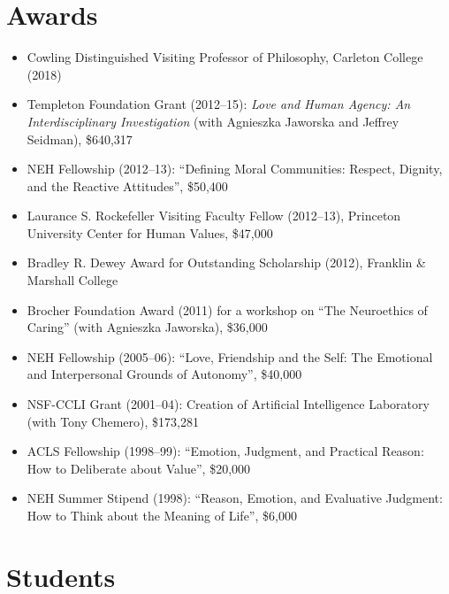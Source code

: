 \documentclass[%
  11pt,%
]{article}
\begin{document}
\section{Awards}

\begin{itemize}

  \item Cowling Distinguished Visiting Professor of Philosophy, Carleton College (2018)
  \item Templeton Foundation Grant (2012--15): \emph{Love and Human Agency: An Interdisciplinary Investigation} (with Agnieszka Jaworska and Jeffrey Seidman), \$640,317
  \item NEH Fellowship (2012--13): \enquote{Defining Moral Communities: Respect, Dignity, and the Reactive Attitudes}, \$50,400
  \item Laurance S. Rockefeller Visiting Faculty Fellow (2012--13), Princeton University Center for Human Values, \$47,000
  \item Bradley R. Dewey Award for Outstanding Scholarship (2012), Franklin \& Marshall College
  \item Brocher Foundation Award (2011) for a workshop on \enquote{The Neuroethics of Caring} (with Agnieszka Jaworska), \$36,000
  \item NEH Fellowship (2005--06): \enquote{Love, Friendship and the Self: The Emotional and Interpersonal Grounds of Autonomy}, \$40,000
  \item NSF-CCLI Grant (2001--04): Creation of Artificial Intelligence Laboratory (with Tony Chemero), \$173,281
  \item ACLS Fellowship (1998--99): \enquote{Emotion, Judgment, and Practical Reason: How to Deliberate about Value}, \$20,000
  \item NEH Summer Stipend (1998): \enquote{Reason, Emotion, and Evaluative Judgment: How to Think about the Meaning of Life}, \$6,000

\end{itemize}

\section{Students}
\end{document}
